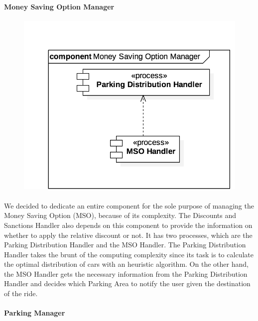 		\paragraph{Money Saving Option Manager}
			\begin{figure}[h]
				\includegraphics[scale=0.4, center]{img/component_diagrams/09_money_saving_option_manager.png}
			\end{figure}
		
		\paragraph{} We decided to dedicate an entire component for the sole purpose of managing the Money Saving Option (MSO), because of its complexity. The Discounts and Sanctions Handler also depends on this component to provide the information on whether to apply the relative discount or not. It has two processes, which are the Parking Distribution Handler and the MSO Handler. The Parking Distribution Handler takes the brunt of the computing complexity since its task is to calculate the optimal distribution of cars with an heuristic algorithm. On the other hand, the MSO Handler gets the necessary information from the Parking Distribution Handler and decides which Parking Area to notify the user given the destination of the ride.
		
		
		\paragraph{Parking Manager}
		
